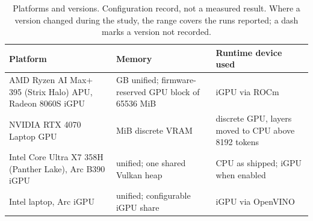 \documentclass[conference,10pt]{IEEEtran}
\begin{document}
\begin{table}[t]
\caption{Platforms and versions. Configuration record, not a measured result. Where a version changed during the
study, the range covers the runs reported; a dash marks a version not recorded.}
\label{tab:platforms}
\centering\footnotesize
\begin{tabular}{@{}>{\raggedright\arraybackslash}p{}>{\raggedright\arraybackslash}p{}>{\raggedright\arraybackslash}p{}@{}}
\toprule
Platform & Memory & Runtime device used \\
\midrule
AMD Ryzen AI Max+ 395 (Strix Halo) APU, Radeon 8060S iGPU & 128 GB unified; firmware-reserved GPU block of 65536 MiB %
& iGPU via ROCm %
\\
NVIDIA RTX 4070 Laptop GPU & 8188 MiB discrete VRAM %
& discrete GPU, layers moved to CPU above 8192 tokens %
\\
Intel Core Ultra X7 358H (Panther Lake), Arc B390 iGPU & unified; one shared Vulkan heap %
& CPU as shipped; iGPU when enabled %
\\
Intel laptop, Arc iGPU & unified; configurable iGPU share & iGPU via OpenVINO \\
\bottomrule
\end{tabular}


\end{table}
\end{document}
